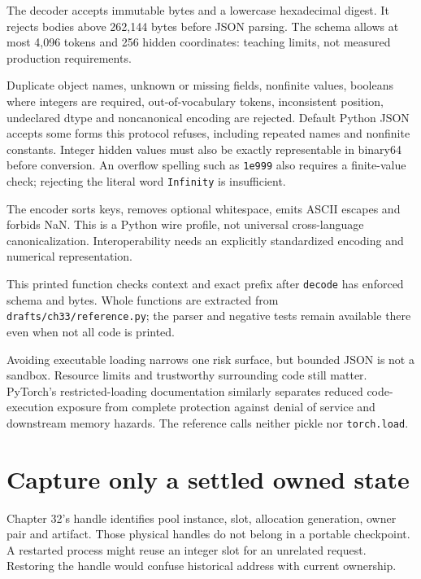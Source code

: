 The decoder accepts immutable bytes and a lowercase hexadecimal digest.
It rejects bodies above 262,144 bytes before JSON parsing. The schema allows
at most 4,096 tokens and 256 hidden coordinates: teaching limits, not
measured production requirements.

Duplicate object names, unknown or missing fields, nonfinite values, booleans
where integers are required, out-of-vocabulary tokens, inconsistent position,
undeclared dtype and noncanonical encoding are rejected. Default Python JSON
accepts some forms this protocol refuses, including repeated names and
nonfinite constants.\cite{python-json} Integer hidden values must also be
exactly representable in binary64 before conversion. An overflow spelling such as
\texttt{1e999} also requires a finite-value check; rejecting the literal word
\texttt{Infinity} is insufficient.

The encoder sorts keys, removes optional whitespace, emits ASCII escapes and
forbids NaN. This is a Python wire profile, not universal cross-language
canonicalization. Interoperability needs an explicitly standardized encoding
and numerical representation.


This printed function checks context and exact prefix after \texttt{decode}
has enforced schema and bytes. Whole functions are extracted from
\texttt{drafts/ch33/reference.py}; the parser and negative tests remain
available there even when not all code is printed.

Avoiding executable loading narrows one risk surface, but bounded JSON is
not a sandbox. Resource limits and trustworthy surrounding code still matter.
PyTorch's restricted-loading documentation similarly separates reduced
code-execution exposure from complete protection against denial of service
and downstream memory hazards.\cite{pytorch-load}
The reference calls neither pickle nor \texttt{torch.load}.

\section{Capture only a settled owned state}

Chapter 32's handle identifies pool instance, slot, allocation generation,
owner pair and artifact. Those physical handles do not belong in a portable
checkpoint. A restarted process might reuse an integer slot for an unrelated
request. Restoring the handle would confuse historical address with current
ownership.

